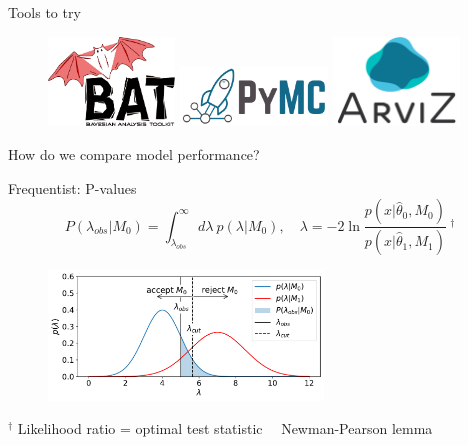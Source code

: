 \documentclass[
aspectratio=169,
14pt,
professionalfonts
]{beamer}
\newcommand{\arrow}{~\ding{220}~}
\begin{document}
\begin{frame}{Tools to try}
    \begin{figure}
        \center
        \href{
            https://github.com/bat
        }{\includegraphics[width=0.3\textwidth]{../plots/bat.pdf}}
        \hfill
        \href{
            https://www.pymc.io/
        }{\includegraphics[width=0.35\textwidth]{../plots/pymc.png}}
        \hfill
        \href{
            https://python.arviz.org/en/stable/
        }{\includegraphics[width=0.3\textwidth]{../plots/arviz.png}}
    \end{figure}
\end{frame}

\appendix

\begin{frame}
    \center
    \Large
    How do we compare model performance?
\end{frame}

\begin{frame}{Frequentist: P-values}
    \vspace{-1cm}
    $$
    P(\lambda_{obs}|M_0) = \int_{\lambda_{obs}}^\infty d\lambda ~ p(\lambda|M_0), \quad  \lambda = -2 \ln \frac{p(x|\hat \theta_0, M_0)}{p(x|\hat \theta_1, M_1)} ~^\dagger
    $$
    \begin{figure}
        \centering
        \includegraphics[width=0.65\textwidth]{../plots/hypo.pdf}
    \end{figure}
    \small
    $^\dagger$ Likelihood ratio = optimal test statistic \arrow Newman-Pearson lemma
\end{frame}
\end{document}
